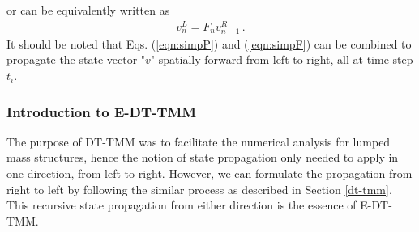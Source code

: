 \documentclass[11pt]{ucthesis}
\begin{document}
or can be equivalently written as
\begin{eqnarray}
v_n^L = F_n v_{n-1}^R \,.
\label{eqn:simpF}
\end{eqnarray}
It should be noted that Eqs. (\ref{eqn:simpP}) and (\ref{eqn:simpF}) can be combined to propagate the state vector "$v$" spatially forward from left to right, all at time step $t_i$.

\subsubsection{Introduction to E-DT-TMM}	\label{e-dt-tmm}
The purpose of DT-TMM \cite{kumar1986new} was to facilitate the numerical analysis for lumped mass structures, hence the notion of state propagation only needed to apply in one direction, from left to right. However, we can formulate the propagation from right to left by following the similar process as described in Section \ref{dt-tmm}. This recursive state propagation from either direction is the essence of E-DT-TMM.  
\end{document}
